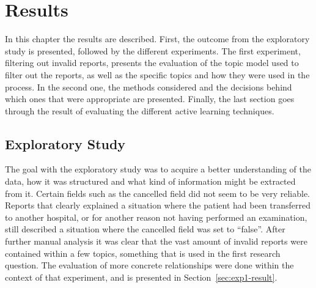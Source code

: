 \chapter{Results}
\label{cha:results}




In this chapter the results are described.
First, the outcome from the exploratory study is presented, followed by the different experiments.
The first experiment, filtering out invalid reports, presents the evaluation of the topic model used to filter out the reports, as well as the specific topics and how they were used in the process.
In the second one, the methods considered and the decisions behind which ones that were appropriate are presented.
Finally, the last section goes through the result of evaluating the different active learning techniques.

\section{Exploratory Study}

The goal with the exploratory study was to acquire a better understanding of the data, how it was structured and what kind of information might be extracted from it.
Certain fields such as the cancelled field did not seem to be very reliable. 
Reports that clearly explained a situation where the patient had been transferred to another hospital, or for another reason not having performed an examination, still described a situation where the cancelled field was set to ``false''.
After further manual analysis it was clear that the vast amount of invalid reports were contained within a few topics, something that is used in the first research question.
The evaluation of more concrete relationships were done within the context of that experiment, and is presented in Section~\ref{sec:exp1-result}.

